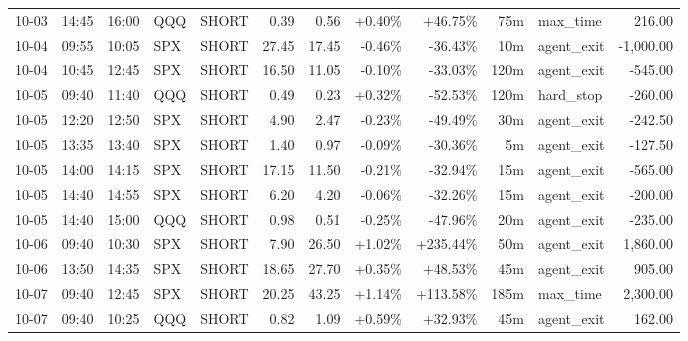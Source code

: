 \documentclass[11pt,a4paper,twoside]{article}
\begin{document}
\begin{center}
\begin{longtable}{>{\color{txtmain}}l l l l l r r r r r >{\color{txtmain}}l r}
10-03 & 14:45 & 16:00 & QQQ & SHORT & 0.39 & 0.56 & \textcolor{wingreen}{+0.40\%} & \textcolor{wingreen}{+46.75\%} & 75m & max\_time & \textcolor{wingreen}{216.00} \\
10-04 & 09:55 & 10:05 & SPX & SHORT & 27.45 & 17.45 & \textcolor{lossred}{-0.46\%} & \textcolor{lossred}{-36.43\%} & 10m & agent\_exit & \textcolor{lossred}{-1,000.00} \\
10-04 & 10:45 & 12:45 & SPX & SHORT & 16.50 & 11.05 & \textcolor{lossred}{-0.10\%} & \textcolor{lossred}{-33.03\%} & 120m & agent\_exit & \textcolor{lossred}{-545.00} \\
10-05 & 09:40 & 11:40 & QQQ & SHORT & 0.49 & 0.23 & \textcolor{wingreen}{+0.32\%} & \textcolor{lossred}{-52.53\%} & 120m & hard\_stop & \textcolor{lossred}{-260.00} \\
10-05 & 12:20 & 12:50 & SPX & SHORT & 4.90 & 2.47 & \textcolor{lossred}{-0.23\%} & \textcolor{lossred}{-49.49\%} & 30m & agent\_exit & \textcolor{lossred}{-242.50} \\
10-05 & 13:35 & 13:40 & SPX & SHORT & 1.40 & 0.97 & \textcolor{lossred}{-0.09\%} & \textcolor{lossred}{-30.36\%} & 5m & agent\_exit & \textcolor{lossred}{-127.50} \\
10-05 & 14:00 & 14:15 & SPX & SHORT & 17.15 & 11.50 & \textcolor{lossred}{-0.21\%} & \textcolor{lossred}{-32.94\%} & 15m & agent\_exit & \textcolor{lossred}{-565.00} \\
10-05 & 14:40 & 14:55 & SPX & SHORT & 6.20 & 4.20 & \textcolor{lossred}{-0.06\%} & \textcolor{lossred}{-32.26\%} & 15m & agent\_exit & \textcolor{lossred}{-200.00} \\
10-05 & 14:40 & 15:00 & QQQ & SHORT & 0.98 & 0.51 & \textcolor{lossred}{-0.25\%} & \textcolor{lossred}{-47.96\%} & 20m & agent\_exit & \textcolor{lossred}{-235.00} \\
10-06 & 09:40 & 10:30 & SPX & SHORT & 7.90 & 26.50 & \textcolor{wingreen}{+1.02\%} & \textcolor{wingreen}{+235.44\%} & 50m & agent\_exit & \textcolor{wingreen}{1,860.00} \\
10-06 & 13:50 & 14:35 & SPX & SHORT & 18.65 & 27.70 & \textcolor{wingreen}{+0.35\%} & \textcolor{wingreen}{+48.53\%} & 45m & agent\_exit & \textcolor{wingreen}{905.00} \\
10-07 & 09:40 & 12:45 & SPX & SHORT & 20.25 & 43.25 & \textcolor{wingreen}{+1.14\%} & \textcolor{wingreen}{+113.58\%} & 185m & max\_time & \textcolor{wingreen}{2,300.00} \\
10-07 & 09:40 & 10:25 & QQQ & SHORT & 0.82 & 1.09 & \textcolor{wingreen}{+0.59\%} & \textcolor{wingreen}{+32.93\%} & 45m & agent\_exit & \textcolor{wingreen}{162.00} \\

\end{longtable}
\end{center}
\end{document}
